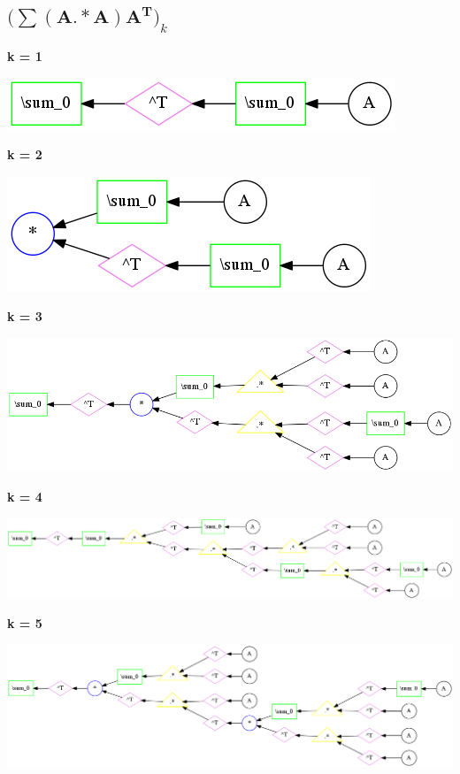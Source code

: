 \subsection{$\mathbf{(\sum (A.*A)A^T})_k$}



{\bf k = 1}


\begin{center}
\includegraphics[width=0.45\linewidth]{trees/SumAmultA_1_horizontal_0.png}
\end{center}


{\bf k = 2}


\begin{center}
\includegraphics[width=0.45\linewidth]{trees/SumAmultA_2_horizontal_0.png}
\end{center}


{\bf k = 3}


\begin{center}
\includegraphics[width=0.45\linewidth]{trees/SumAmultA_3_horizontal_0.png}
\end{center}


{\bf k = 4}


\begin{center}
\includegraphics[width=0.45\linewidth]{trees/SumAmultA_4_horizontal_0.png}
\end{center}


{\bf k = 5}


\begin{center}
\includegraphics[width=0.45\linewidth]{trees/SumAmultA_5_horizontal_0.png}
\end{center}


